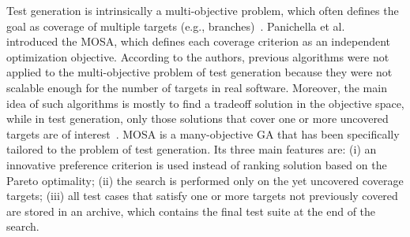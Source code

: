 \documentclass{article}
\begin{document}

Test generation is intrinsically a multi-objective problem, which often defines the goal as coverage of multiple targets (e.g., branches)~\cite{Panichella2018}. Panichella et al.~\cite{Panichella_2015} introduced the \ac{MOSA}, which defines each coverage criterion as an independent optimization objective. According to the authors, previous algorithms were not applied to the multi-objective problem of test generation because they were not scalable enough for the number of targets in real software. Moreover, the main idea of such algorithms is mostly to find a tradeoff solution in the objective space, while in test generation, only those solutions that cover one or more uncovered targets are of interest~\cite{Panichella2018}. \ac{MOSA} is a many-objective \ac{GA} that has been specifically tailored to the problem of test generation. Its three main features are: (i) an innovative preference criterion is used instead of ranking solution based on the Pareto optimality; (ii) the search is performed only on the yet uncovered coverage targets; (iii) all test cases that satisfy one or more targets not previously covered are stored in an archive, which contains the final test suite at the end of the search.
\end{document}

